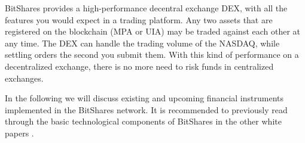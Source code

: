 BitShares provides a high-performance decentral exchange DEX, with all the
features you would expect in a trading platform. Any two assets that are
registered on the blockchain (MPA or UIA) may be traded against each other at
any time. The DEX can handle the trading volume of the NASDAQ, while settling
orders the second you submit them. With this kind of performance on a
decentralized exchange, there is no more need to risk funds in centralized
exchanges.


In the following we will discuss existing and upcoming financial instruments
implemented in the BitShares network. It is recommended to previously read
through the basic technological components of BitShares in the other white
papers
\cite{bts:general,bts:financial,bts:consensus,bts:growth,bts:structure,bts:history}.
